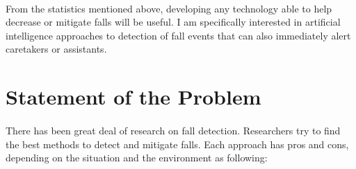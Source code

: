 \paragraph{}
From the statistics mentioned above, developing any technology able to help decrease or mitigate falls will be useful. I am specifically interested in artificial intelligence approaches to detection of fall events that can also immediately alert caretakers or assistants.

\section{Statement of the Problem}
\paragraph{}
There has been great deal of research on fall detection. Researchers try to find the best methods to detect and mitigate falls. Each approach has pros and cons, depending on the situation and the environment as following:
